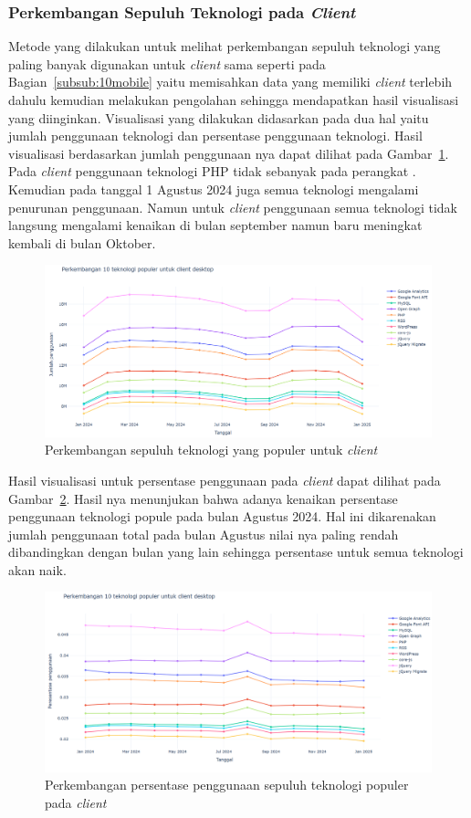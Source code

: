 \subsubsection{Perkembangan Sepuluh Teknologi pada \textit{Client} \desktop}

Metode yang dilakukan untuk melihat perkembangan sepuluh teknologi yang paling banyak digunakan untuk \textit{client} \desktop sama seperti pada Bagian~\ref{subsub:10mobile} yaitu memisahkan data yang memiliki \textit{client} \desktop terlebih dahulu kemudian melakukan pengolahan sehingga mendapatkan hasil visualisasi yang diinginkan. Visualisasi yang dilakukan didasarkan pada dua hal yaitu jumlah penggunaan teknologi dan persentase penggunaan teknologi. Hasil visualisasi berdasarkan jumlah penggunaan nya dapat dilihat pada Gambar~\ref{fig:10dekstop}. Pada \textit{client} \desktop penggunaan teknologi PHP tidak sebanyak pada perangkat \mobile. Kemudian pada tanggal 1 Agustus 2024 juga semua teknologi mengalami penurunan penggunaan. Namun untuk \textit{client} \desktop penggunaan semua teknologi tidak langsung mengalami kenaikan di bulan september namun baru meningkat kembali di bulan Oktober.
\begin{figure}[H]
    \centering
    \includegraphics[width=0.7\linewidth]{Gambar/Perkembangan 10 teknologi pada desktop.png}
    \caption{Perkembangan sepuluh teknologi yang populer untuk \textit{client} \desktop}
    \label{fig:10dekstop}
\end{figure}

Hasil visualisasi untuk persentase penggunaan pada \textit{client} \desktop dapat dilihat pada Gambar~\ref{fig:persentasedesktop}. Hasil nya menunjukan bahwa adanya kenaikan persentase penggunaan teknologi popule pada bulan Agustus 2024. Hal ini dikarenakan jumlah penggunaan total pada bulan Agustus nilai nya paling rendah dibandingkan dengan bulan yang lain sehingga persentase untuk semua teknologi akan naik.
\begin{figure}[H]
    \centering
    \includegraphics[width=0.7\linewidth]{Gambar/Perkembangan persentase pada desktop.png}
    \caption{Perkembangan persentase penggunaan sepuluh teknologi populer pada \textit{client} \desktop}
    \label{fig:persentasedesktop}
\end{figure}